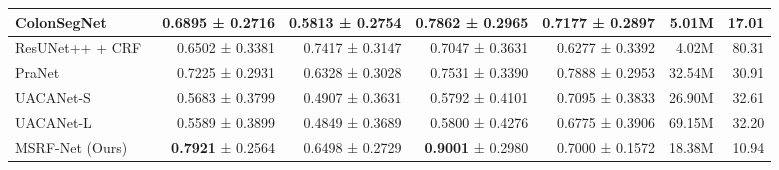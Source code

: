 \documentclass[journal,twoside,web]{IEEEtran}
\begin{document}
\begin{table*} [!t]
\begin{tabular}{l|r|r|r|r|r|r}
ColonSegNet~\cite{jha2021real} & 0.6895 ± 0.2716 & 0.5813 ± 0.2754 & 0.7862 ± 0.2965  & 0.7177 ± 0.2897 & 5.01M & 17.01\\ \hline

ResUNet++ + CRF~\cite{jha2021comprehensive}& 0.6502 ± 0.3381 & 0.7417 ± 0.3147 & 0.7047 ± 0.3631 & 0.6277 ± 0.3392 & 4.02M & 80.31  \\ \hline

PraNet~\cite{fan2020pranet}  & 0.7225 ± 0.2931 & 0.6328 ± 0.3028 & 0.7531 ± 0.3390 & 0.7888 ± 0.2953 & 32.54M & 30.91  \\ \hline

UACANet-S~\cite{kim2021uacanet} & 0.5683 ± 0.3799 & 0.4907 ± 0.3631 & 0.5792 ± 0.4101 & 0.7095 ± 0.3833 & 26.90M & 32.61 \\ \hline

UACANet-L~\cite{kim2021uacanet}& 0.5589 ± 0.3899  & 0.4849 ± 0.3689 & 0.5800 ± 0.4276 & 0.6775 ± 0.3906 & 69.15M & 32.20 \\ \hline

MSRF-Net (Ours) & \textbf{0.7921} ± 0.2564 & 0.6498 ± 0.2729 & \textbf{0.9001} ± 0.2980 & 0.7000 ± 0.1572 & 18.38M & 10.94\\ \hline   
\bottomrule
\end{tabular}
\vspace{-5mm}
\end{table*}
\end{document}
